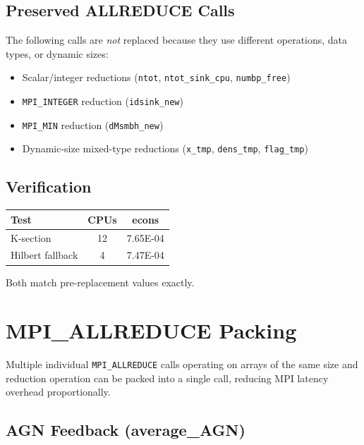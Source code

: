 \documentclass[11pt,fleqn]{book}
\begin{document}
\section{Preserved ALLREDUCE Calls}

The following calls are \emph{not} replaced because they use different operations, data types, or dynamic sizes:

\begin{itemize}[leftmargin=2em]
  \item Scalar/integer reductions (\texttt{ntot}, \texttt{ntot\_sink\_cpu}, \texttt{numbp\_free})
  \item \texttt{MPI\_INTEGER} reduction (\texttt{idsink\_new})
  \item \texttt{MPI\_MIN} reduction (\texttt{dMsmbh\_new})
  \item Dynamic-size mixed-type reductions (\texttt{x\_tmp}, \texttt{dens\_tmp}, \texttt{flag\_tmp})
\end{itemize}

\section{Verification}

\begin{center}
\begin{tabular}{lcc}
\toprule
\textbf{Test} & \textbf{CPUs} & \textbf{econs} \\
\midrule
K-section & 12 & 7.65E-04 \\
Hilbert fallback & 4 & 7.47E-04 \\
\bottomrule
\end{tabular}
\end{center}

Both match pre-replacement values exactly.


\chapter{MPI\_ALLREDUCE Packing}
\label{ch:allreduce-packing}

Multiple individual \texttt{MPI\_ALLREDUCE} calls operating on arrays of the same size and reduction operation can be packed into a single call, reducing MPI latency overhead proportionally.

\section{AGN Feedback (average\_AGN)}
\end{document}
